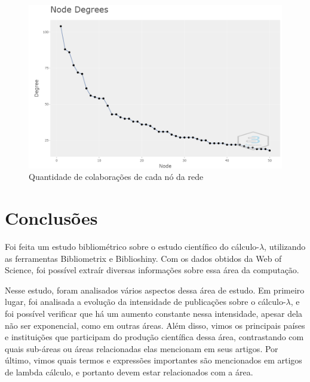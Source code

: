\begin{figure}
    \centering
    \includegraphics[width=1\textwidth]{experiments/LeoRiether/AnaliseBibliometrica/LambdaCalculus/WoS-20220208/Images/CollaborationNetworkDegrees.png}
    \caption{Quantidade de colaborações de cada nó da rede}
    \label{fig:LC@LeoRiether:CollaborationNetworkDegrees}
\end{figure}

\section{Conclusões}
Foi feita um estudo bibliométrico sobre o estudo científico do cálculo-$\lambda$, utilizando as ferramentas Bibliometrix e Biblioshiny. Com os dados obtidos da Web of Science, foi possível extraír diversas informações sobre essa área da computação.

Nesse estudo, foram analisados vários aspectos dessa área de estudo. Em primeiro lugar, foi analisada a evolução da intensidade de publicações sobre o cálculo-$\lambda$, e foi possível verificar que há um aumento constante nessa intensidade, apesar dela não ser exponencial, como em outras áreas. Além disso, vimos os principais países e instituições que participam do produção científica dessa área, contrastando com quais sub-áreas ou áreas relacionadas elas mencionam em seus artigos. Por último, vimos quais termos e expressões importantes são mencionados em artigos de lambda cálculo, e portanto devem estar relacionados com a área.
